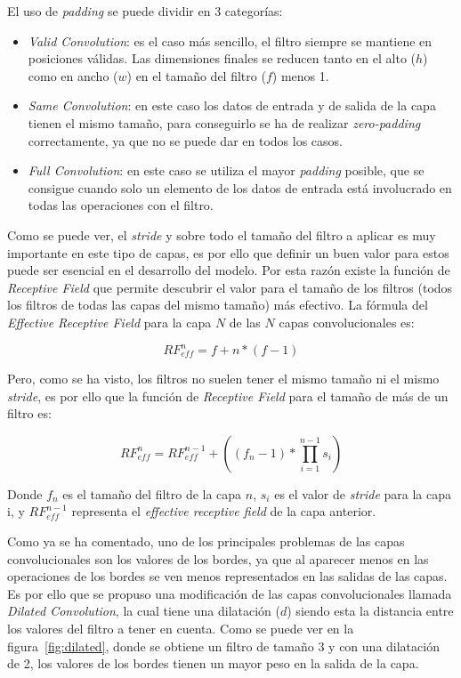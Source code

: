 El uso de \textit{padding} se puede dividir en 3 categorías:
\begin{itemize}
	\item \textit{Valid Convolution}: es el caso más sencillo, el filtro siempre se mantiene en posiciones válidas. Las dimensiones finales se reducen tanto en el alto ($h$) como en ancho ($w$) en el tamaño del filtro ($f$) menos 1.
	\item \textit{Same Convolution}: en este caso los datos de entrada y de salida de la capa tienen el mismo tamaño, para conseguirlo se ha de realizar \textit{zero-padding} correctamente, ya que no se puede dar en todos los casos.
	\item \textit{Full Convolution}: en este caso se utiliza el mayor \textit{padding} posible, que se consigue cuando solo un elemento de los datos de entrada está involucrado en todas las operaciones con el filtro.
\end{itemize}

Como se puede ver, el \textit{stride} y sobre todo el tamaño del filtro a aplicar es muy importante en este tipo de capas, es por ello que definir un buen valor para estos puede ser esencial en el desarrollo del modelo. Por esta razón existe la función de \textit{Receptive Field} que permite descubrir el valor para el tamaño de los filtros (todos los filtros de todas las capas del mismo tamaño) más efectivo. La fórmula del \textit{Effective Receptive Field} para la capa $N$ de las $N$ capas convolucionales es:

\begin{equation}
RF_{eff}^n = f + n*(f-1)
\end{equation}

Pero, como se ha visto, los filtros no suelen tener el mismo tamaño ni el mismo \textit{stride}, es por ello que la función de \textit{Receptive Field} para el tamaño de más de un filtro es:

\begin{equation}
RF_{eff}^n = RF_{eff}^{n-1} + ((f_n -1)* \prod_{i=1}^{n-1}s_i)
\end{equation}

Donde $f_n$ es el tamaño del filtro de la capa $n$, $s_i$ es el valor de \textit{stride} para la capa i, y $RF_{eff}^{n-1}$ representa el \textit{effective receptive field} de la capa anterior.

Como ya se ha comentado, uno de los principales problemas de las capas convolucionales son los valores de los bordes, ya que al aparecer menos en las operaciones de los bordes se ven menos representados en las salidas de las capas. Es por ello que se propuso una modificación de las capas convolucionales llamada \textit{Dilated Convolution}, la cual tiene una dilatación ($d$) siendo esta la distancia entre los valores del filtro a tener en cuenta. Como se puede ver en la figura~\ref{fig:dilated}, donde se obtiene un filtro de tamaño 3 y con una dilatación de 2, los valores de los bordes tienen un mayor peso en la salida de la capa.

